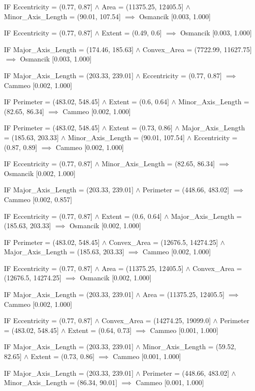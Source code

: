 IF Eccentricity = (0.77, 0.87] $\land$ Area = (11375.25, 12405.5] $\land$ Minor_Axis_Length = (90.01, 107.54] $\implies$ Osmancik [0.003, 1.000]

IF Eccentricity = (0.77, 0.87] $\land$ Extent = (0.49, 0.6] $\implies$ Osmancik [0.003, 1.000]

IF Major_Axis_Length = (174.46, 185.63] $\land$ Convex_Area = (7722.99, 11627.75] $\implies$ Osmancik [0.003, 1.000]

IF Major_Axis_Length = (203.33, 239.01] $\land$ Eccentricity = (0.77, 0.87] $\implies$ Cammeo [0.002, 1.000]

IF Perimeter = (483.02, 548.45] $\land$ Extent = (0.6, 0.64] $\land$ Minor_Axis_Length = (82.65, 86.34] $\implies$ Cammeo [0.002, 1.000]

IF Perimeter = (483.02, 548.45] $\land$ Extent = (0.73, 0.86] $\land$ Major_Axis_Length = (185.63, 203.33] $\land$ Minor_Axis_Length = (90.01, 107.54] $\land$ Eccentricity = (0.87, 0.89] $\implies$ Cammeo [0.002, 1.000]

IF Eccentricity = (0.77, 0.87] $\land$ Minor_Axis_Length = (82.65, 86.34] $\implies$ Osmancik [0.002, 1.000]

IF Major_Axis_Length = (203.33, 239.01] $\land$ Perimeter = (448.66, 483.02] $\implies$ Cammeo [0.002, 0.857]

IF Eccentricity = (0.77, 0.87] $\land$ Extent = (0.6, 0.64] $\land$ Major_Axis_Length = (185.63, 203.33] $\implies$ Osmancik [0.002, 1.000]

IF Perimeter = (483.02, 548.45] $\land$ Convex_Area = (12676.5, 14274.25] $\land$ Major_Axis_Length = (185.63, 203.33] $\implies$ Cammeo [0.002, 1.000]

IF Eccentricity = (0.77, 0.87] $\land$ Area = (11375.25, 12405.5] $\land$ Convex_Area = (12676.5, 14274.25] $\implies$ Osmancik [0.002, 1.000]

IF Major_Axis_Length = (203.33, 239.01] $\land$ Area = (11375.25, 12405.5] $\implies$ Cammeo [0.002, 1.000]

IF Eccentricity = (0.77, 0.87] $\land$ Convex_Area = (14274.25, 19099.0] $\land$ Perimeter = (483.02, 548.45] $\land$ Extent = (0.64, 0.73] $\implies$ Cammeo [0.001, 1.000]

IF Major_Axis_Length = (203.33, 239.01] $\land$ Minor_Axis_Length = (59.52, 82.65] $\land$ Extent = (0.73, 0.86] $\implies$ Cammeo [0.001, 1.000]

IF Major_Axis_Length = (203.33, 239.01] $\land$ Perimeter = (448.66, 483.02] $\land$ Minor_Axis_Length = (86.34, 90.01] $\implies$ Cammeo [0.001, 1.000]

